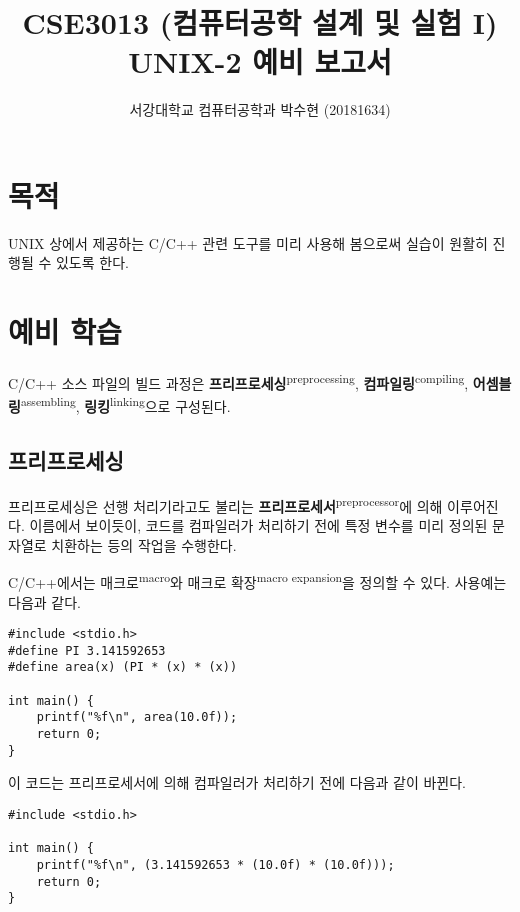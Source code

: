 \documentclass[runningheads]{llncs}
\newcommand{\translation}[1]{\textsuperscript{#1}}
\begin{document}
\title{CSE3013 (컴퓨터공학 설계 및 실험 I) \space \newline UNIX-2 예비 보고서}
\author{서강대학교 컴퓨터공학과 박수현 (20181634)}
\maketitle

\section{목적}
UNIX 상에서 제공하는 C/C++ 관련 도구를 미리 사용해 봄으로써 실습이 원활히 진행될 수 있도록 한다.

\section{예비 학습}
C/C++ 소스 파일의 빌드 과정은 \textbf{프리프로세싱}\translation{preprocessing}, \textbf{컴파일링}\translation{compiling}, \textbf{어셈블링}\translation{assembling}, \textbf{링킹}\translation{linking}으로 구성된다.

\subsection{프리프로세싱}
프리프로세싱은 선행 처리기라고도 불리는 \textbf{프리프로세서}\translation{preprocessor}에 의해 이루어진다. 이름에서 보이듯이, 코드를 컴파일러가 처리하기 전에 특정 변수를 미리 정의된 문자열로 치환하는 등의 작업을 수행한다.

C/C++에서는 매크로\translation{macro}와 매크로 확장\translation{macro expansion}을 정의할 수 있다. 사용예는 다음과 같다.

\begin{verbatim}
#include <stdio.h>
#define PI 3.141592653
#define area(x) (PI * (x) * (x))

int main() {
    printf("%f\n", area(10.0f));
    return 0;
}
\end{verbatim}

이 코드는 프리프로세서에 의해 컴파일러가 처리하기 전에 다음과 같이 바뀐다.

\begin{verbatim}
#include <stdio.h>

int main() {
    printf("%f\n", (3.141592653 * (10.0f) * (10.0f)));
    return 0;
}
\end{verbatim}
\end{document}
